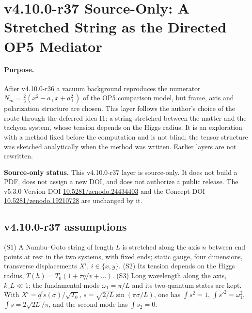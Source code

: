 \clearpage
\section*{v4.10.0-r37 Source-Only: A Stretched String as the Directed OP5 Mediator}
\label{sec:v4100-r37-string-mediator}

\paragraph{Purpose.}
After v4.10.0-r36 a vacuum background reproduces the numerator \(N_m=\tfrac23(x^2-a_\perp x+a_\perp^2)\) of the OP5 comparison model, but frame, axis and
polarization structure are chosen.  This layer follows the author's choice of the route through the deferred idea I1: a string stretched
between the matter and the tachyon system, whose tension depends on the Higgs radius.  It is an exploration with a method fixed before the
computation and is not blind; the tensor structure was sketched analytically when the method was written.  Earlier layers are not rewritten.

\noindent\textbf{Source-only status.}
This v4.10.0-r37 layer is source-only.  It does not build a PDF, does not assign a new DOI,
and does not authorize a public release.  The v5.3.0 Version DOI
\href{https://doi.org/10.5281/zenodo.24434403}{10.5281/zenodo.24434403} and the Concept DOI
\href{https://doi.org/10.5281/zenodo.19210728}{10.5281/zenodo.19210728} are unchanged by it.

\subsection*{v4.10.0-r37 assumptions}
\label{subsec:v4100-r37-assumptions}

(S1) A Nambu--Goto string of length \(L\) is stretched along the axis \(n\) between end points at rest in the two systems, with fixed ends;
static gauge, four dimensions, transverse displacements \(X^i\), \(i\in\{x,y\}\).  (S2) Its tension depends on the Higgs radius,
\(T(h)=T_0(1+\tau\eta/v+\dots)\).  (S3) Long wavelength along the axis, \(k_zL\ll1\); the fundamental mode \(\omega_1=\pi/L\) and its two-quantum states are kept.
With \(X^i=q^i s(\sigma)/\sqrt{T_0}\), \(s=\sqrt{2/L}\sin(\pi\sigma/L)\), one has \(\int s^2=1\), \(\int s'^2=\omega_1^2\), \(\int s=2\sqrt{2L}/\pi\), and the second mode has
\(\int s_2=0\).

